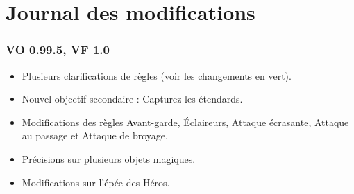 
\part{Journal des modifications}

\section*{VO 0.99.5, VF 1.0}
\begin{itemize}
\item Plusieurs clarifications de règles (voir les changements en vert). 
\item Nouvel objectif secondaire : Capturez les étendards.
\item Modifications des règles Avant-garde, Éclaireurs, Attaque écrasante, Attaque au passage et Attaque de broyage.
\item Précisions sur plusieurs objets magiques.
\item Modifications sur l'épée des Héros.
\end{itemize}